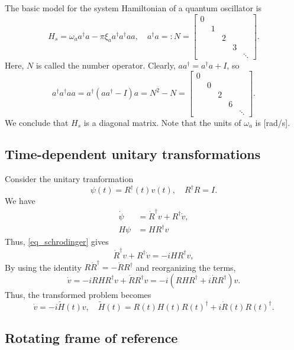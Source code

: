 \documentclass[11pt]{article}
\begin{document}
The basic model for the system Hamiltonian of a quantum oscillator is
\begin{equation}\label{eq_quantum-osc}
  H_s = \omega_a a^\dag a - \pi \xi_a a^\dag a^\dag a a,\quad a^\dag a =: N = \begin{bmatrix}
  0 & & & & \\
  & 1 & & & \\
  && 2 && \\
  &&& 3 & \\
  &&&& \ddots
\end{bmatrix}.
\end{equation}
Here, $N$ is called the number operator. Clearly, $aa^\dag = a^\dag a + I$, so
\[
a^\dag a^\dag a a = a^\dag ( a a^\dag - I) a = N^2 - N =
\begin{bmatrix}
  0 & & & & \\
  & 0 & & & \\
  && 2 && \\
  &&& 6 & \\
  &&&& \ddots
\end{bmatrix}.
\]
We conclude that $H_s$ is a diagonal matrix. Note that the units of $\omega_a$ is [rad/s].

\subsection{Time-dependent unitary transformations}
Consider the unitary tranformation
\[
\psi(t) = R^{\dag}(t)v(t),\quad R^\dag R = I.
\]
We have
\begin{align*}
\dot{\psi} &= \dot{R}^\dag v + R^\dag \dot{v},\\
H\psi &= H R^\dag v
\end{align*}
Thus, \eqref{eq_schrodinger} gives
\[
\dot{R}^\dag v + R^\dag \dot{v} = -i H R^\dag v,
\]
By using the identity $R \dot{R}^\dag = - \dot{R} R^\dag$ and reorganizing the terms,
\[
\dot{v} = -i R H R^\dag v + \dot{R} R^\dag v = -i\left( RHR^\dag + i \dot{R} R^\dag \right) v.
\]
Thus, the transformed problem becomes
\begin{equation}\label{eq_timedep_trans}
\dot{v} = -i \tilde{H}(t) v,\quad \tilde{H}(t) = R(t)H(t)R(t)^\dag + i \dot{R}(t) R(t)^\dag.
\end{equation}

\subsection{Rotating frame of reference}
\end{document}
